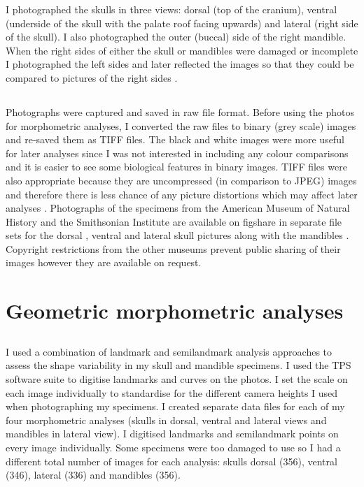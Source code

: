	I photographed the skulls in three views: dorsal (top of the cranium), ventral (underside of the skull with the palate roof facing upwards) and lateral (right side of the skull). I also photographed the outer (buccal) side of the right mandible. When the right sides of either the skull or mandibles were damaged or incomplete I photographed the left sides and later reflected the images so that they could be compared to pictures of the right sides \citep[e.g.][]{Barrow2008}.


\subsection{}
	Photographs were captured and saved in raw file format. Before using the photos for morphometric analyses, I converted the raw files to binary (grey scale) images and re-saved them as TIFF files. The black and white images were more useful for later analyses since I was not interested in including any colour comparisons and it is easier to see some biological features in binary images. TIFF files were also appropriate because they are uncompressed (in comparison to JPEG) images and therefore there is less chance of any picture distortions which may affect later analyses \citep{RHOI2013}.
	Photographs of the specimens from the American Museum of Natural History and the Smithsonian Institute are available on figshare in separate file sets for the dorsal \citep{Finlay2013d}, ventral \citep{Finlay2013v} and lateral \citep{Finlay2013l} skull pictures along with the mandibles \citep{Finlay2013m}. Copyright restrictions from the other museums prevent public sharing of their images however they are available on request.
	


\section{Geometric morphometric analyses}
\label{sect:morphometrics}

\subsection{}


	I used a combination of landmark and semilandmark analysis approaches to assess the shape variability in my skull and mandible specimens. %
	I used the TPS software suite \citep{Rohlf2013} to digitise landmarks and curves on the photos. I set the scale on each image individually to standardise for the different camera heights I used when photographing my specimens. I created separate data files for each of my four morphometric analyses (skulls in dorsal, ventral and lateral views and mandibles in lateral view). I digitised landmarks and semilandmark points on every image individually. Some specimens were too damaged to use so I had a different total number of images for each analysis: skulls dorsal (356), ventral (346), lateral (336) and mandibles (356).

